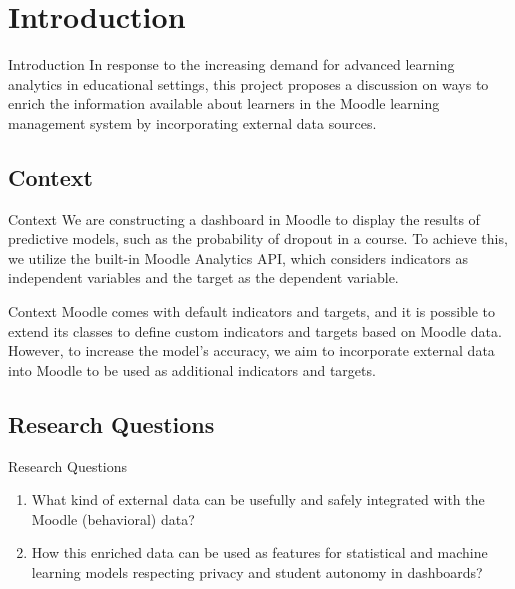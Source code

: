 \section{Introduction}

\begin{frame}{Introduction}
    In response to the increasing demand for advanced learning analytics in educational settings, 
    this project proposes a discussion on ways to enrich the information available about learners 
    in the Moodle learning management system by incorporating external data sources.
    \cite{park2015development}
\end{frame}

\subsection{Context}
\begin{frame}{Context}
    We are constructing a dashboard in Moodle to display the results of predictive models, 
    such as the probability of dropout in a course. 
    To achieve this, we utilize the built-in Moodle Analytics API, 
    which considers indicators as independent variables and the target as the dependent variable.
\end{frame}

\begin{frame}{Context}
    Moodle comes with default indicators and targets, and it is possible to extend its 
    classes to define custom indicators and targets based on Moodle data. 
    However, to increase the model's accuracy, we aim to incorporate external 
    data into Moodle to be used as additional indicators and targets.
\end{frame}

\subsection{Research Questions}
\begin{frame}{Research Questions}
    \begin{enumerate}[<+-|alert@+>]\color{gray}
        \item What kind of external data can be usefully and safely integrated with 
              the Moodle (behavioral) data?
        \item How this enriched data can be used as features for statistical and 
              machine learning models respecting privacy and student autonomy in dashboards?
    \end{enumerate}
\end{frame}